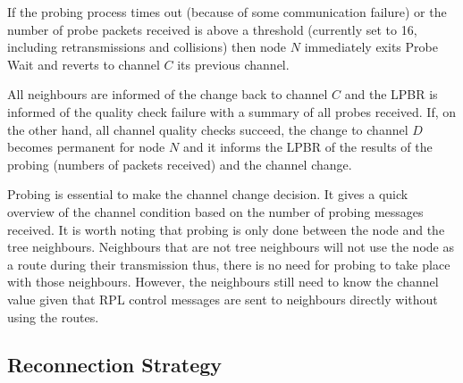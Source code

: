 If the probing process times out (because of some communication failure) or the number of probe packets received is above a threshold (currently set to 16, including retransmissions and collisions) then node $N$ immediately exits Probe Wait and reverts to channel $C$ its previous channel. 


All neighbours are informed of the change back to channel $C$ and the LPBR is informed of the quality check failure with a summary of all probes received.
If, on the other hand, all channel quality checks succeed, the change to channel $D$ becomes permanent for node $N$ and it informs the LPBR of the results of the probing (numbers of packets received) and the channel change.

Probing is essential to make the channel change decision. It gives a quick overview of the channel condition based on the number of probing messages received. It is worth noting that probing is only done between the node and the tree neighbours. Neighbours that are not tree neighbours will not use the node as a route during their transmission thus, there is no need for probing to take place with those neighbours. However, the neighbours still need to know the channel value given that RPL control messages are sent to neighbours directly without using the routes.

\subsection{Reconnection Strategy}

